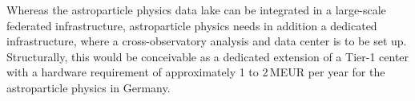 Whereas the astroparticle physics data lake can be integrated in a large-scale federated infrastructure, astroparticle physics needs in addition a dedicated infrastructure, where a cross-observatory analysis and data center is to be set up. 
Structurally, this would be conceivable as a dedicated extension of a Tier-1
center with a hardware requirement of approximately 1 to 2\,MEUR per year for the astroparticle physics in Germany.












